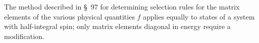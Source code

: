 The method described in \S~97 for determining selection rules for the matrix elements of the various physical quantities $f$ applies equally to states of a system with half-integral spin; only matrix elements diagonal in energy require a modification.

